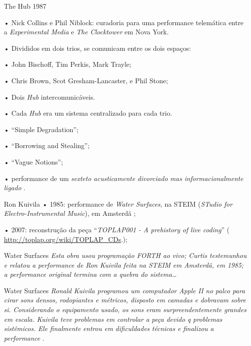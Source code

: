 \documentclass[aspectratio=169]{beamer}
\begin{document}
\begin{frame}{The Hub}
1987

• Nick Collins e Phil Niblock: curadoria para uma performance telemática entre a \emph{Experimental Media} e \emph{The Clocktower} em Nova York. 

• Divididos em dois trios, se comunicam entre os dois espaços:

  • John Bischoff, Tim Perkis, Mark Trayle;
  
  • Chris Brown, Scot Gresham-Lancaster, e Phil Stone;
  
  • Dois \emph{Hub} intercomunicáveis. 
  
  • Cada \emph{Hub} era um sistema centralizado para cada trio. 
  
  • ``Simple Degradation'';
  
  • ``Borrowing and Stealing'';
  
  • ``Vague Notions'';
  
  •  performance de um \emph{sexteto acusticamente divorciado mas informacionalmente ligado} \cite[seção 2.2]{brown_indigenous_2013}.
\end{frame}

\begin{frame}{Ron Kuivila}
• 1985: performance de \emph{Water Surfaces}, na STEIM (\emph{STudio for Electro-Instrumental Music}), em Amsterdã ;

• 2007: reconstrução da peça ``\emph{TOPLAP001 - A prehistory of live coding}'' ( \url{http://toplap.org/wiki/TOPLAP_CDs}.); 
\end{frame}

\begin{frame}{Water Surfaces}
\emph{Esta obra usou programação FORTH ao vivo; Curtis  testemunhou e relatou a performance de Ron Kuivila feita na STEIM em Amsterdã, em 1985; a performance original termina com a quebra do sistema\ldots}
\end{frame}

\begin{frame}{Water Surfaces}
\emph{Ronald Kuivila programou um computador Apple II no palco para cirar sons densos, rodopiantes e métricos, disposto em camadas e dobravam sobre si. Considerando o equipamento usado, os sons eram surpreendentemente grandes em escala. Kuivila teve problemas em controlar a peça devido q problemas sistêmicos. Ele finalmente entrou em dificuldades técnicas e finalizou a performance} \cite[p.~47]
{roads_steim_1986}.
\end{frame}
\end{document}
